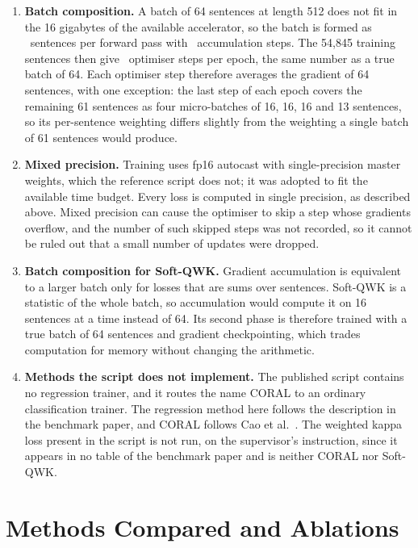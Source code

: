 \begin{enumerate}
\item \textbf{Batch composition.} A batch of 64 sentences at length 512 does not fit in the 16
gigabytes of the available accelerator, so the batch is formed as \microBatch\ sentences per
forward pass with \gradAccum\ accumulation steps. The 54{,}845 training sentences then give
\stepsPerEpoch\ optimiser steps per epoch, the same number as a true batch of 64. Each
optimiser step therefore averages the gradient of 64 sentences, with one exception: the last
step of each epoch covers the remaining 61 sentences as four micro-batches of 16, 16, 16 and
13 sentences, so its per-sentence weighting differs slightly from the weighting a single batch
of 61 sentences would produce.

\item \textbf{Mixed precision.} Training uses fp16 autocast with single-precision master
weights, which the reference script does not; it was adopted to fit the available time budget.
Every loss is computed in single precision, as described above. Mixed precision can cause the
optimiser to skip a step whose gradients overflow, and the number of such skipped steps was not
recorded, so it cannot be ruled out that a small number of updates were dropped.

\item \textbf{Batch composition for Soft-QWK.} Gradient accumulation is equivalent to a larger
batch only for losses that are sums over sentences. Soft-QWK is a statistic of the whole batch,
so accumulation would compute it on 16 sentences at a time instead of 64. Its second phase is
therefore trained with a true batch of 64 sentences and gradient checkpointing, which trades
computation for memory without changing the arithmetic.

\item \textbf{Methods the script does not implement.} The published script contains no
regression trainer, and it routes the name CORAL to an ordinary classification trainer. The
regression method here follows the description in the benchmark paper, and CORAL follows Cao et
al.\ \cite{cao2020coral}. The weighted kappa loss present in the script is not run, on the
supervisor's instruction, since it appears in no table of the benchmark paper and is neither
CORAL nor Soft-QWK.
\end{enumerate}

\section{Methods Compared and Ablations}
\label{sec:meth-methods}

